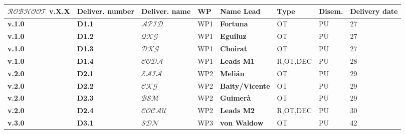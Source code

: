 \documentclass[11pt, a4paper]{article} %
\begin{document}
\begin{table}[h!]
\begin{center}
  \begin{tabular}{|m{2cm} || m{1.25cm} || m{1.75cm} || m{1.55cm} || m{2.4cm} || m{1.7cm} || m{1.15cm} || m{1.7cm}|}
  \hline\hline
  \rowcolor{lightpink!30}
  {\bf $\mathcal{ROBHOOT}$ v.X.X} & {\bf Deliver. number} & {\bf Deliver. name} & {\bf WP} & {\bf Name Lead} & {\bf Type} & {\bf Disem.} & {\bf Delivery date} \\
  \hline\hline
  \rowcolor{piggypink!20}
  {\bf v.1.0} & {\bf D1.1} & $\mathcal{APID}$ & WP1 & {\bf Fortuna} & OT & PU & 27 \\
  \hline\hline
  \rowcolor{piggypink!20}
  {\bf v.1.0} & {\bf D1.2} & $\mathcal{QKG}$ & WP1 & {\bf Egu\'iluz} & OT & PU  & 27 \\
  \hline\hline
   \rowcolor{piggypink!20}
  {\bf v.1.0} & {\bf D1.3} & $\mathcal{DKG}$ & WP1 & {\bf Choirat} & OT & PU  & 27 \\
  \hline\hline
  \rowcolor{piggypink!20}
  {\bf v.1.0} & {\bf D1.4} & $\mathcal{CODA}$ & WP1 & {\bf Leads M1} & R,OT,DEC & PU  & 28 \\
    \hline\hline
 \rowcolor{piggypink!40}
  {\bf v.2.0} & {\bf D2.1} & $\mathcal{EAIA}$ & WP2 & {\bf Meli\'an} & OT & PU & 29 \\
  \hline\hline
  \rowcolor{piggypink!40}
  {\bf v.2.0} & {\bf D2.2} & $\mathcal{CKG}$ & WP2 & {\bf Baity/Vicente} & OT & PU  & 29 \\
  \hline\hline
   \rowcolor{piggypink!40}
  {\bf v.2.0} & {\bf D2.3} & $\mathcal{BSM}$ & WP2 & {\bf Guimer\`a} & OT & PU  & 29 \\
  \hline\hline
  \rowcolor{piggypink!40}
    {\bf v.2.0} & {\bf D2.4} & $\mathcal{COCAU}$ & WP2 & {\bf Leads M2} & R,OT,DEC & PU & 30 \\
    \hline\hline
   \rowcolor{piggypink!60}
  {\bf v.3.0} & {\bf D3.1} & $\mathcal{SDN}$ & WP3 & {\bf von Waldow} & OT & PU & 42 \\
  \hline\hline

\end{tabular}
\end{center}
\end{table}
\end{document}
